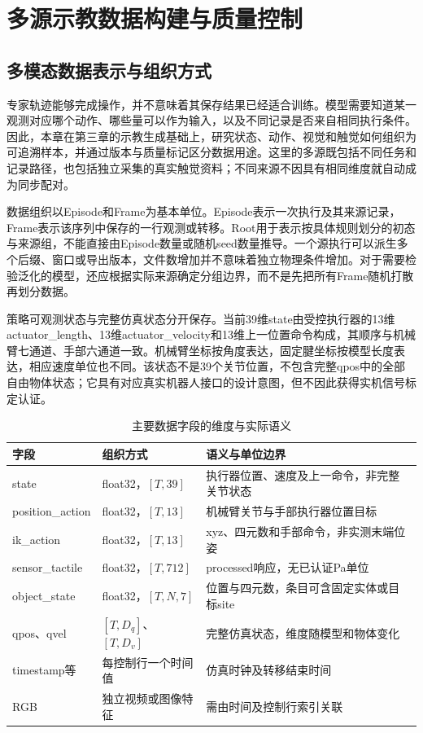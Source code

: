 \chapter{多源示教数据构建与质量控制}
\label{chap:multimodal_data}

\section{多模态数据表示与组织方式}
\label{sec:data_representation}

专家轨迹能够完成操作，并不意味着其保存结果已经适合训练。模型需要知道某一观测对应哪个动作、哪些量可以作为输入，以及不同记录是否来自相同执行条件。因此，本章在第三章的示教生成基础上，研究状态、动作、视觉和触觉如何组织为可追溯样本，并通过版本与质量标记区分数据用途。这里的多源既包括不同任务和记录路径，也包括独立采集的真实触觉资料；不同来源不因具有相同维度就自动成为同步配对。

数据组织以Episode和Frame为基本单位。Episode表示一次执行及其来源记录，Frame表示该序列中保存的一行观测或转移。Root用于表示按具体规则划分的初态与来源组，不能直接由Episode数量或随机seed数量推导。一个源执行可以派生多个后缀、窗口或导出版本，文件数增加并不意味着独立物理条件增加。对于需要检验泛化的模型，还应根据实际来源确定分组边界，而不是先把所有Frame随机打散再划分数据。

策略可观测状态与完整仿真状态分开保存。当前39维state由受控执行器的13维actuator\_length、13维actuator\_velocity和13维上一位置命令构成，其顺序与机械臂七通道、手部六通道一致。机械臂坐标按角度表达，固定腱坐标按模型长度表达，相应速度单位也不同。该状态不是39个关节位置，不包含完整qpos中的全部自由物体状态；它具有对应真实机器人接口的设计意图，但不因此获得实机信号标定认证。

\begin{table}[htbp]
 \centering\small
 \caption{主要数据字段的维度与实际语义}
 \label{tab:ch04_fields}
 \begin{tabular}{p{}p{}p{}}
 \hline
 字段 & 组织方式 & 语义与单位边界\\
 \hline
 state & float32，$[T,39]$ & 执行器位置、速度及上一命令，非完整关节状态\\
 position\_action & float32，$[T,13]$ & 机械臂关节与手部执行器位置目标\\
 ik\_action & float32，$[T,13]$ & xyz、四元数和手部命令，非实测末端位姿\\
 sensor\_tactile & float32，$[T,712]$ & processed响应，无已认证Pa单位\\
 object\_state & float32，$[T,N,7]$ & 位置与四元数，条目可含固定实体或目标site\\
 qpos、qvel & $[T,D_q]$、$[T,D_v]$ & 完整仿真状态，维度随模型和物体变化\\
 timestamp等 & 每控制行一个时间值 & 仿真时钟及转移结束时间\\
 RGB & 独立视频或图像特征 & 需由时间及控制行索引关联\\
 \hline
 \end{tabular}
\end{table}

